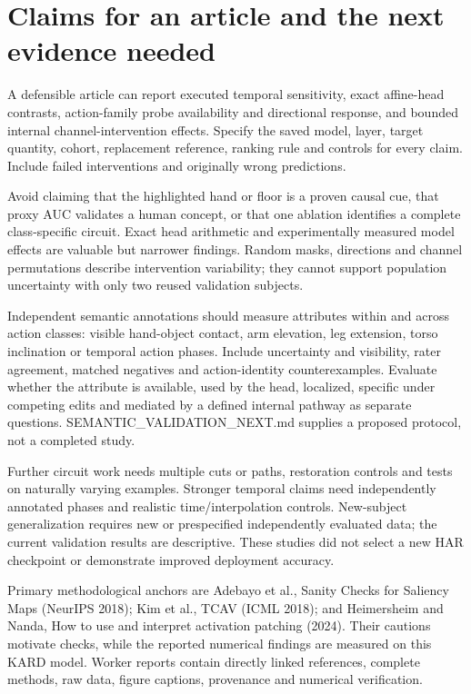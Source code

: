 \documentclass[11pt]{article}
\begin{document}
\section{Claims for an article and the next evidence needed}
A defensible article can report executed temporal sensitivity, exact affine-head contrasts, action-family probe availability and directional response, and bounded internal channel-intervention effects. Specify the saved model, layer, target quantity, cohort, replacement reference, ranking rule and controls for every claim. Include failed interventions and originally wrong predictions.

Avoid claiming that the highlighted hand or floor is a proven causal cue, that proxy AUC validates a human concept, or that one ablation identifies a complete class-specific circuit. Exact head arithmetic and experimentally measured model effects are valuable but narrower findings. Random masks, directions and channel permutations describe intervention variability; they cannot support population uncertainty with only two reused validation subjects.

Independent semantic annotations should measure attributes within and across action classes: visible hand-object contact, arm elevation, leg extension, torso inclination or temporal action phases. Include uncertainty and visibility, rater agreement, matched negatives and action-identity counterexamples. Evaluate whether the attribute is available, used by the head, localized, specific under competing edits and mediated by a defined internal pathway as separate questions. SEMANTIC\_VALIDATION\_NEXT.md supplies a proposed protocol, not a completed study.

Further circuit work needs multiple cuts or paths, restoration controls and tests on naturally varying examples. Stronger temporal claims need independently annotated phases and realistic time/interpolation controls. New-subject generalization requires new or prespecified independently evaluated data; the current validation results are descriptive. These studies did not select a new HAR checkpoint or demonstrate improved deployment accuracy.

Primary methodological anchors are Adebayo et al., Sanity Checks for Saliency Maps (NeurIPS 2018); Kim et al., TCAV (ICML 2018); and Heimersheim and Nanda, How to use and interpret activation patching (2024). Their cautions motivate checks, while the reported numerical findings are measured on this KARD model. Worker reports contain directly linked references, complete methods, raw data, figure captions, provenance and numerical verification.
\end{document}
